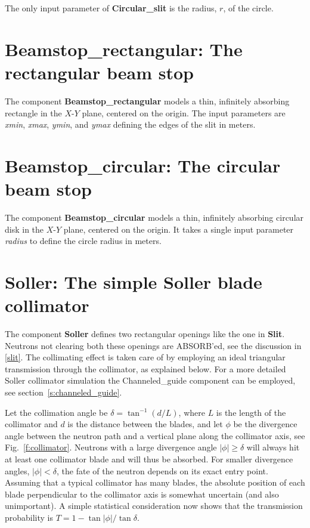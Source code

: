 The only input parameter of {\bf Circular\_slit} is
the radius, $r$, of the circle.

\section{Beamstop\_rectangular: The rectangular beam stop}
\label{s:Beamstop_rectangular}
The component {\bf Beamstop\_rectangular} models a thin, infinitely
absorbing rectangle in the $X$-$Y$ plane, centered on the origin. The
input parameters are \textit{xmin}, \textit{xmax}, \textit{ymin}, and
\textit{ymax} defining the edges of the slit in meters.


\section{Beamstop\_circular: The circular beam stop}
\label{s:Beamstop_circular}
The component {\bf Beamstop\_circular} models a thin, infinitely
absorbing circular disk in the $X$-$Y$ plane, centered on the origin. It
takes a single input parameter \textit{radius} to define the circle
radius in meters.


\section{Soller: The simple Soller blade collimator}
The component {\bf Soller} defines two rectangular openings
like the one in {\bf Slit}. Neutrons not clearing both these
openings are ABSORB'ed, see the discussion in \ref{slit}.
The collimating effect is taken care of by employing an ideal
triangular transmission through the collimator, as explained below.
For a more detailed Soller collimator simulation the Channeled\_guide
component can be employed, see section~\ref{s:channeled_guide}.

Let the collimation angle be $\delta = \tan^{-1}(d/L)$,
where $L$ is the length of the collimator
and $d$ is the distance between the blades,
and let $\phi$ be the divergence angle between the 
neutron path and a vertical plane along the collimator axis, 
see Fig.~\ref{f:collimator}. Neutrons with a large 
divergence angle $|\phi| \geq \delta$ will always
hit at least one collimator blade and will thus be absorbed.
For smaller divergence angles, $|\phi| < \delta$, the fate of the
neutron depends on its exact entry point.
Assuming that a typical collimator has many blades, the
absolute position of each blade perpendicular to the collimator axis
is somewhat uncertain (and also unimportant).
A simple statistical consideration now shows that the transmission
probability is $T = 1-\tan|\phi|/\tan\delta$.

